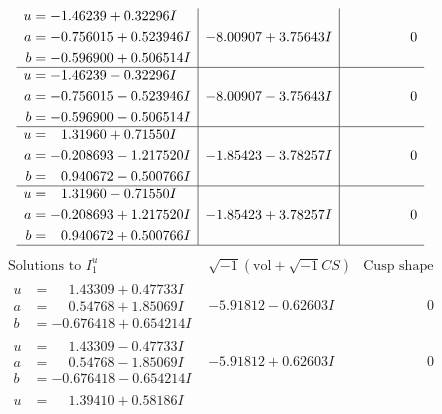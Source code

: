 \documentclass[1p]{elsarticle_modified}
\theoremstyle{definition}
\newcommand{\I}{\sqrt{-1}}
\begin{document}
$$\begin{array}{c|c|c}
\begin{aligned}
u &= -1.46239 + 0.32296 I \\
a &= -0.756015 + 0.523946 I \\
b &= -0.596900 + 0.506514 I\end{aligned}
 & -8.00907 + 3.75643 I & \phantom{-0.000000 } 0 \\ \hline\begin{aligned}
u &= -1.46239 - 0.32296 I \\
a &= -0.756015 - 0.523946 I \\
b &= -0.596900 - 0.506514 I\end{aligned}
 & -8.00907 - 3.75643 I & \phantom{-0.000000 } 0 \\ \hline\begin{aligned}
u &= \phantom{-}1.31960 + 0.71550 I \\
a &= -0.208693 - 1.217520 I \\
b &= \phantom{-}0.940672 - 0.500766 I\end{aligned}
 & -1.85423 - 3.78257 I & \phantom{-0.000000 } 0 \\ \hline\begin{aligned}
u &= \phantom{-}1.31960 - 0.71550 I \\
a &= -0.208693 + 1.217520 I \\
b &= \phantom{-}0.940672 + 0.500766 I\end{aligned}
 & -1.85423 + 3.78257 I & \phantom{-0.000000 } 0\\
 \hline 
 \end{array}$$\newpage$$\begin{array}{c|c|c}  
\text{Solutions to }I^u_{1}& \I (\text{vol} + \sqrt{-1}CS) & \text{Cusp shape}\\
 \hline 
\begin{aligned}
u &= \phantom{-}1.43309 + 0.47733 I \\
a &= \phantom{-}0.54768 + 1.85069 I \\
b &= -0.676418 + 0.654214 I\end{aligned}
 & -5.91812 - 0.62603 I & \phantom{-0.000000 } 0 \\ \hline\begin{aligned}
u &= \phantom{-}1.43309 - 0.47733 I \\
a &= \phantom{-}0.54768 - 1.85069 I \\
b &= -0.676418 - 0.654214 I\end{aligned}
 & -5.91812 + 0.62603 I & \phantom{-0.000000 } 0 \\ \hline\begin{aligned}
u &= \phantom{-}1.39410 + 0.58186 I \\

\end{aligned}
\end{array}$$
\end{document}
